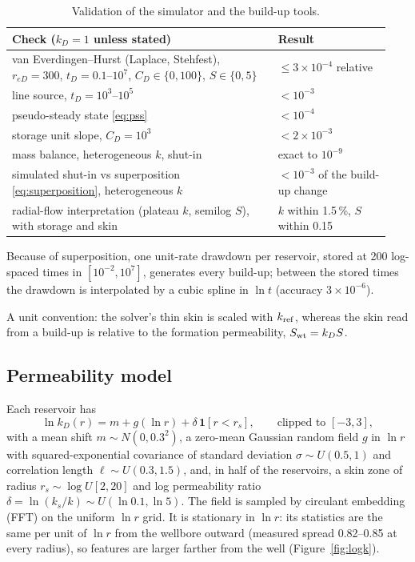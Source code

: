 \documentclass[11pt]{article}
\newcommand{\reD}{r_{eD}}
\begin{document}
\begin{table}[h]
  \centering
  \small
  \begin{tabular}{@{}p{0.66\linewidth}p{0.28\linewidth}@{}}
    \toprule
    Check ($k_D = 1$ unless stated) & Result \\
    \midrule
    van Everdingen--Hurst (Laplace, Stehfest), $\reD=300$, $t_D = 0.1$--$10^7$, $C_D\in\{0,100\}$, $S\in\{0,5\}$ & $\le 3\times10^{-4}$ relative \\
    line source, $t_D = 10^3$--$10^5$ & $<10^{-3}$ \\
    pseudo-steady state \eqref{eq:pss} & $<10^{-4}$ \\
    storage unit slope, $C_D = 10^3$ & $<2\times10^{-3}$ \\
    mass balance, heterogeneous $k$, shut-in & exact to $10^{-9}$ \\
    simulated shut-in vs superposition \eqref{eq:superposition}, heterogeneous $k$ & $<10^{-3}$ of the build-up change \\
    radial-flow interpretation (plateau $k$, semilog $S$), with storage and skin & $k$ within 1.5\,\%, $S$ within 0.15 \\
    \bottomrule
  \end{tabular}
  \caption{Validation of the simulator and the build-up tools.}
  \label{tab:solver}
\end{table}

Because of superposition, one unit-rate drawdown per reservoir, stored at 200 log-spaced times in $[10^{-2},
10^7]$, generates every build-up; between the stored times the drawdown is interpolated by a cubic spline in
$\ln t$ (accuracy $3\times10^{-6}$).

A unit convention: the solver's thin skin is scaled with $k_{\rm ref}$, whereas the skin read from a build-up is
relative to the formation permeability, $S_{\rm wt} = k_D S$.

\subsection{Permeability model}

Each reservoir has
\begin{equation}
  \ln k_D(r) = m + g(\ln r) + \delta\,\mathbf 1[r < r_s], \qquad \text{clipped to } [-3, 3],
\end{equation}
with a mean shift $m\sim N(0, 0.3^2)$, a zero-mean Gaussian random field $g$ in $\ln r$ with squared-exponential
covariance of standard deviation $\sigma\sim U(0.5,1)$ and correlation length $\ell\sim U(0.3,1.5)$, and, in half
of the reservoirs, a skin zone of radius $r_s\sim\log U[2,20]$ and log permeability ratio
$\delta = \ln(k_s/k)\sim U(\ln 0.1, \ln 5)$. The field is sampled by circulant embedding (FFT) on the uniform
$\ln r$ grid. It is stationary in $\ln r$: its statistics are the same per unit of $\ln r$ from the wellbore
outward (measured spread 0.82--0.85 at every radius), so features are larger farther from the well
(Figure~\ref{fig:logk}).
\end{document}
